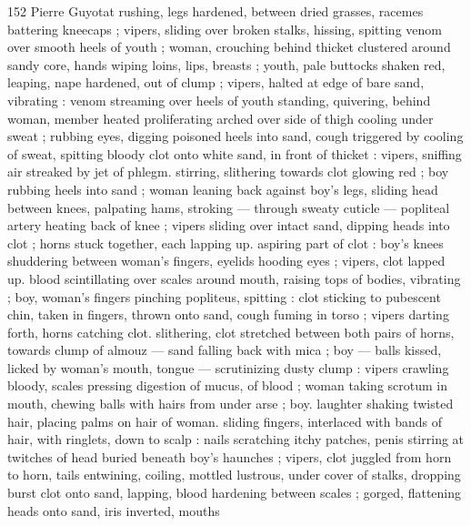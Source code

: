 152 Pierre Guyotat
rushing, legs hardened, between dried grasses, racemes battering
kneecaps ; vipers, sliding over broken stalks, hissing, spitting venom
over smooth heels of youth ; woman, crouching behind thicket
clustered around sandy core, hands wiping loins, lips, breasts ;
youth, pale buttocks shaken red, leaping, nape hardened, out of
clump ; vipers, halted at edge of bare sand, vibrating : venom
streaming over heels of youth standing, quivering, behind woman,
member heated proliferating arched over side of thigh cooling under
sweat ; rubbing eyes, digging poisoned heels into sand, cough
triggered by cooling of sweat, spitting bloody clot onto white sand,
in front of thicket : vipers, sniffing air streaked by jet of phlegm.
stirring, slithering towards clot glowing red ; boy rubbing heels into
sand ; woman leaning back against boy's legs, sliding head between
knees, palpating hams, stroking — through sweaty cuticle —
popliteal artery heating back of knee ; vipers sliding over intact
sand, dipping heads into clot ; horns stuck together, each lapping up.
aspiring part of clot : boy's knees shuddering between woman's
fingers, eyelids hooding eyes ; vipers, clot lapped up. blood
scintillating over scales around mouth, raising tops of bodies,
vibrating ; boy, woman's fingers pinching popliteus, spitting : clot
sticking to pubescent chin, taken in fingers, thrown onto sand, cough
fuming in torso ; vipers darting forth, horns catching clot. slithering,
clot stretched between both pairs of horns, towards clump of almouz
— sand falling back with mica ; boy — balls kissed, licked by
woman's mouth, tongue — scrutinizing dusty clump : vipers crawling
bloody, scales pressing digestion of mucus, of blood ; woman taking
scrotum in mouth, chewing balls with hairs from under arse ; boy.
laughter shaking twisted hair, placing palms on hair of woman. sliding
fingers, interlaced with bands of hair, with ringlets, down to scalp :
nails scratching itchy patches, penis stirring at twitches of head
buried beneath boy's haunches ; vipers, clot juggled from horn to
horn, tails entwining, coiling, mottled lustrous, under cover of stalks,
dropping burst clot onto sand, lapping, blood hardening between
scales ; gorged, flattening heads onto sand, iris inverted, mouths

